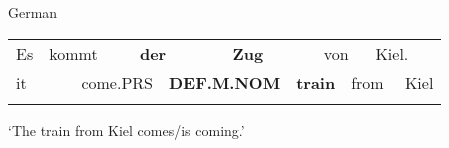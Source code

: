 
\begin{listWWNumileveli}
\item {}

\begin{styleExample}
German

\end{styleExample}

\end{listWWNumileveli}

\begin{tabular}{llllllllllll}
\lsptoprule
Es & \multicolumn{2}{l}{kommt

} & \multicolumn{2}{l}{{\bfseries der}

} & \multicolumn{2}{l}{{\bfseries Zug}

} & \multicolumn{2}{l}{von

} & \multicolumn{2}{l}{Kiel.

} & \\
\multicolumn{2}{l}{it

} & \multicolumn{2}{l}{come.PRS

} & \multicolumn{2}{l}{{\bfseries DEF.M.NOM}

} & \multicolumn{2}{l}{{\bfseries train}

} & \multicolumn{2}{l}{from

} & \multicolumn{2}{l}{Kiel

}\\
\lspbottomrule
\end{tabular}

\begin{styleTranslation}
‘The train from Kiel comes/is coming.’

\end{styleTranslation}

